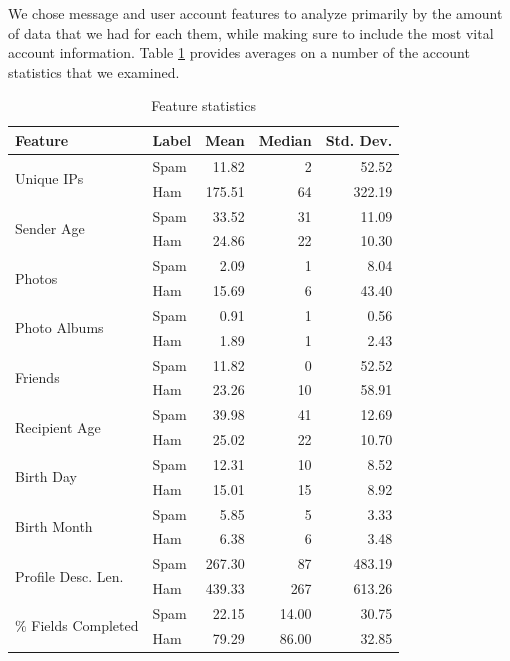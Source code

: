 \documentclass[preprint]{acm_proc_article-sp}
\begin{document}
We chose message and user account features to analyze primarily by the amount of data that we had for each them, while making sure to include the most vital account information. Table \ref{tab:feats} provides averages on a number of the account statistics that we examined. 
\begin{table}
\begin{tabular}{|l|l|r|r|r|}
    \hline
    \textbf{Feature} & \textbf{Label} & \textbf{Mean} & \textbf{Median} & \textbf{Std. Dev.}\\
    \hline
    \multirow{2}{*}{Unique IPs} & Spam & 11.82 & 2 & 52.52\\
    & Ham & 175.51 & 64 & 322.19\\
    \hline
    \multirow{2}{*}{Sender Age} & Spam & 33.52 & 31 & 11.09\\
    & Ham & 24.86 & 22 & 10.30\\
    \hline
    \multirow{2}{*}{Photos} & Spam & 2.09 & 1 & 8.04\\
    & Ham & 15.69 & 6 & 43.40\\
    \hline
    \multirow{2}{*}{Photo Albums} & Spam & 0.91 & 1 & 0.56\\
    & Ham & 1.89 & 1 & 2.43\\
    \hline
    \multirow{2}{*}{Friends} & Spam & 11.82 & 0 & 52.52\\
    & Ham & 23.26 & 10 & 58.91\\
    \hline
    \multirow{2}{*}{Recipient Age} & Spam & 39.98 & 41 & 12.69\\
    & Ham & 25.02 & 22 & 10.70\\
    \hline
    \multirow{2}{*}{Birth Day} & Spam & 12.31 & 10 & 8.52\\
    & Ham & 15.01 & 15 & 8.92\\
    \hline
    \multirow{2}{*}{Birth Month} & Spam & 5.85 & 5 & 3.33\\
    & Ham & 6.38 & 6 & 3.48\\
    \hline
    \multirow{2}{*}{Profile Desc. Len.} & Spam & 267.30 & 87 & 483.19\\
    & Ham & 439.33 & 267 & 613.26\\
    \hline
    \multirow{2}{*}{\% Fields Completed} & Spam & 22.15 & 14.00 & 30.75\\
    & Ham & 79.29 & 86.00 & 32.85\\
    \hline
\end{tabular}
\caption{Feature statistics}
\label{tab:feats}
\end{table}
\end{document}
